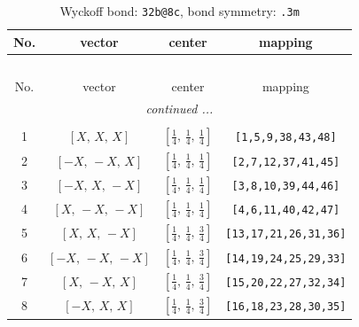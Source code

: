 \documentclass[fleqn,8pt]{jsarticle}
\begin{document}
\begin{longtable}{cccc}
\caption{Wyckoff bond: {\tt 32b@8c}, bond symmetry: {\tt .3m}}
 \\
 \hline \hline
No. & vector & center & mapping \\ \hline \endfirsthead

\multicolumn{3}{l}{\tablename\ \thetable{}} \\
 \hline \hline
No. & vector & center & mapping \\ \hline \endhead

 \hline \hline
\multicolumn{3}{r}{\footnotesize\it continued ...} \\ \endfoot

 \hline \hline
\multicolumn{3}{r}{} \\ \endlastfoot

1 & $\left[ X,\, X,\, X \right]$ & $\left[ \frac{1}{4},\, \frac{1}{4},\, \frac{1}{4} \right]$ & {\tt [1,5,9,38,43,48]} \\ \hline
2 & $\left[ - X,\, - X,\, X \right]$ & $\left[ \frac{1}{4},\, \frac{1}{4},\, \frac{1}{4} \right]$ & {\tt [2,7,12,37,41,45]} \\ \hline
3 & $\left[ - X,\, X,\, - X \right]$ & $\left[ \frac{1}{4},\, \frac{1}{4},\, \frac{1}{4} \right]$ & {\tt [3,8,10,39,44,46]} \\ \hline
4 & $\left[ X,\, - X,\, - X \right]$ & $\left[ \frac{1}{4},\, \frac{1}{4},\, \frac{1}{4} \right]$ & {\tt [4,6,11,40,42,47]} \\ \hline
5 & $\left[ X,\, X,\, - X \right]$ & $\left[ \frac{1}{4},\, \frac{1}{4},\, \frac{3}{4} \right]$ & {\tt [13,17,21,26,31,36]} \\ \hline
6 & $\left[ - X,\, - X,\, - X \right]$ & $\left[ \frac{1}{4},\, \frac{1}{4},\, \frac{3}{4} \right]$ & {\tt [14,19,24,25,29,33]} \\ \hline
7 & $\left[ X,\, - X,\, X \right]$ & $\left[ \frac{1}{4},\, \frac{1}{4},\, \frac{3}{4} \right]$ & {\tt [15,20,22,27,32,34]} \\ \hline
8 & $\left[ - X,\, X,\, X \right]$ & $\left[ \frac{1}{4},\, \frac{1}{4},\, \frac{3}{4} \right]$ & {\tt [16,18,23,28,30,35]} \\
\end{longtable}
\renewcommand{\arraystretch}{1.2}
\end{document}
